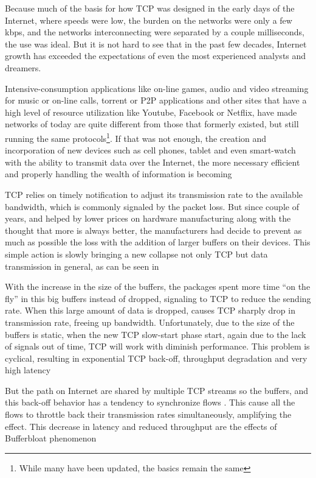 Because much of the basis for how TCP was designed in the early days of the
Internet, where speeds were low, the burden on the networks were only a few
kbps, and the networks interconnecting were separated by a couple
milliseconds, the use was ideal. But it is not hard to see that in the past
few decades, Internet growth has exceeded the expectations of even the most
experienced analysts and dreamers.

Intensive-consumption applications like on-line games, audio and video
streaming for music or on-line calls, torrent or P2P applications and other
sites that have a high level of resource utilization like Youtube, Facebook or
Netflix, have made networks of today are quite different from those that
formerly existed, but still running the same protocols\footnote{While many
have been updated, the basics remain the same}. If that was not enough, the
creation and incorporation of new devices such as cell phones, tablet and even
smart-watch with the ability to transmit data over the Internet, the more
necessary efficient and properly handling the wealth of information is
becoming

TCP relies on timely notification to adjust its transmission rate to the
available bandwidth, which is commonly signaled by the packet loss. But since
couple of years, and helped by lower prices on hardware manufacturing along
with the thought that more is always better, the manufacturers had decide to
prevent as much as possible the loss with the addition of larger buffers on
their devices. This simple action is slowly bringing a new collapse not only
TCP but data transmission in general, as can be seen in \cite{CACMStaff}

With the increase in the size of the buffers, the packages spent more time
``on the fly'' in this big buffers instead of dropped, signaling to TCP to
reduce the sending rate. When this large amount of data is dropped, causes TCP
sharply drop in transmission rate, freeing up bandwidth. Unfortunately, due to
the size of the buffers is static, when the new TCP slow-start phase start,
again due to the lack of signals out of time, TCP will work with diminish
performance. This problem is cyclical, resulting in exponential TCP back-off,
throughput degradation and very high latency

But the path on Internet are shared by multiple TCP streams so the buffers,
and this back-off behavior has a tendency to synchronize flows
\cite{main:ref:1}. This cause all the flows to throttle back their
transmission rates simultaneously, amplifying the effect. This decrease in
latency and reduced throughput are the effects of Bufferbloat phenomenon
